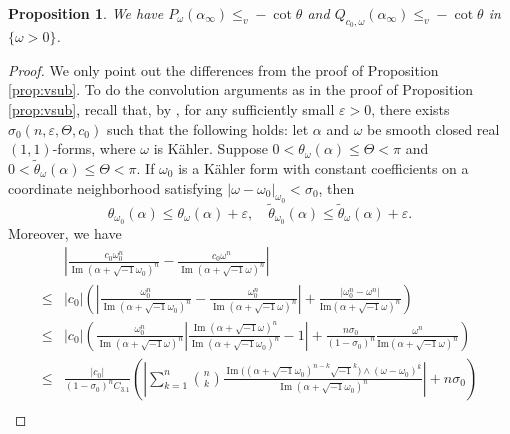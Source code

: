 \documentclass{amsart}
\numberwithin{equation}{section}
\theoremstyle{plain}
\newtheorem{prop}[equation]{Proposition}
\theoremstyle{definition}
\theoremstyle{remark}
\begin{document}
\begin{prop}\label{prop:vsubdHYM}
    We have $P_\omega(\alpha_\infty)\le_v -\cot\theta$ and $Q_{c_0,\omega}(\alpha_\infty)\le_v -\cot\theta$ in $\{\omega>0\}$.
\end{prop}

\begin{proof}
    We only point out the differences from the proof of Proposition \ref{prop:vsub}. To do the convolution arguments as in the proof of Proposition \ref{prop:vsub}, recall that, by \cite[Lemma 5.1]{CL}, for any sufficiently small $\varepsilon>0$, there exists $\sigma_0(n,\varepsilon,\Theta,c_0)$ such that the following holds: let $\alpha$ and $\omega$ be smooth closed real $(1,1)$-forms, where $\omega$ is Kähler. Suppose $0<\theta_\omega(\alpha)\le\Theta<\pi$ and $0<\tilde{\theta}_\omega(\alpha)\le\Theta<\pi$.
    If $\omega_0$ is a Kähler form with constant coefficients on a coordinate neighborhood satisfying $\vert\omega-\omega_0\vert_{\omega_0}<\sigma_0$, then
    \begin{equation}\label{eq:CL}
        \theta_{\omega_0}(\alpha)\le \theta_\omega(\alpha)+\varepsilon,\quad \tilde{\theta}_{\omega_0}(\alpha)\le \tilde{\theta}_\omega(\alpha)+\varepsilon.
    \end{equation}
    Moreover, we have
    \begin{equation}\label{eq:c_0term}
        \begin{aligned}
        &\left\vert\frac{c_0\omega_0^n}{\operatorname{Im}(\alpha+\sqrt{-1}\omega_0)^n}-\frac{c_0\omega^n}{\operatorname{Im}(\alpha+\sqrt{-1}\omega)^n}\right\vert\\
        \le&\vert c_0\vert \left(\left\vert\frac{\omega_0^n}{\operatorname{Im}(\alpha+\sqrt{-1}\omega_0)^n}-\frac{\omega_0^n}{\operatorname{Im}(\alpha+\sqrt{-1}\omega)^n}\right\vert+\frac{\vert\omega_0^n-\omega^n\vert}{\mathrm{Im}(\alpha+\sqrt{-1}\omega)^n}\right)\\
        \le&\vert c_0\vert \left(\frac{\omega_0^n}{\operatorname{Im}(\alpha+\sqrt{-1}\omega)^n}\left\vert\frac{\operatorname{Im}(\alpha+\sqrt{-1}\omega)^n}{\operatorname{Im}(\alpha+\sqrt{-1}\omega_0)^n}-1\right\vert+\frac{n\sigma_0}{(1-\sigma_0)^n}\frac{\omega^n}{\mathrm{Im}(\alpha+\sqrt{-1}\omega)^n}\right)\\
        \le&\frac{\vert c_0\vert}{(1-\sigma_0)^n C_{3.1}}\left(\left\vert\sum_{k=1}^n{n\choose k}\frac{\operatorname{Im}\big((\alpha+\sqrt{-1}\omega_0)^{n-k}\sqrt{-1}^k\big)\wedge(\omega-\omega_0)^k}{\operatorname{Im}(\alpha+\sqrt{-1}\omega_0)^n}\right\vert+n\sigma_0\right)\\

\end{aligned}
\end{equation}
\end{proof}
\end{document}

